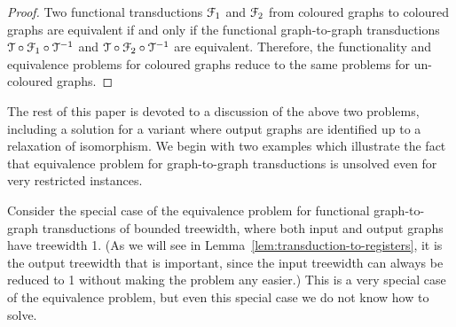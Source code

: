 \begin{proof}
    Two functional \mso transductions ${\mathcal F}_1$ and ${\mathcal F}_2$  from coloured graphs to coloured graphs are equivalent if and only if the functional graph-to-graph \mso transductions  ${\mathcal T} \circ {\mathcal F}_1 \circ {\mathcal T}^{-1}$ and ${\mathcal T} \circ {\mathcal F}_2 \circ {\mathcal T}^{-1}$ are equivalent. 
     Therefore, the functionality and equivalence problems for coloured graphs reduce to the same problems for un-coloured graphs.
\end{proof}

The rest of this paper is devoted to a discussion of the above two problems, including a solution for a variant where output graphs are identified up to a relaxation of isomorphism.
We begin with two examples which illustrate the fact that equivalence problem for graph-to-graph transductions is unsolved even for very restricted instances.

    Consider the special case of the equivalence problem for functional graph-to-graph \mso transductions of bounded treewidth, where both input and output graphs have treewidth 1. (As we will see in Lemma~\ref{lem:transduction-to-registers}, it is the output treewidth that is important, since the input treewidth can always be reduced to 1 without making the problem any easier.) This is a very special case of the equivalence problem, but even this special case we do not know how to solve.
    
